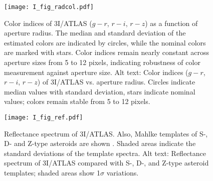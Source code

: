 \documentclass[]{pasj02}
\newcommand\I{3I/ATLAS\xspace}
\begin{document}
\begin{figure*}
 \begin{center}
  \texttt{[image: I\_fig\_radcol.pdf]} 
 \end{center}
\caption{
    Color indices of 3I/ATLAS ($g - r$, $r - i$, $r - z$) 
    as a function of aperture radius. 
    The median and standard deviation of the estimated colors are indicated by circles, while the nominal colors are marked with stars.
    Color indices remain nearly constant across aperture sizes from 5 to 12 pixels, indicating robustness of color measurement against aperture size.
    {Alt text: 
    Color indices ($g - r$, $r - i$, $r - z$) of 3I/ATLAS vs. aperture radius. Circles indicate median values with standard deviation, stars indicate nominal values; colors remain stable from 5 to 12 pixels.} 
}\label{fig:radcol}
\end{figure*}


\begin{figure}
 \begin{center}
  \texttt{[image: I\_fig\_ref.pdf]} 
 \end{center}
\caption{
Reflectance spectrum of \I.
Also, Mahlke templates of S-, D- and Z-type asteroids are shown \citep{Mahlke2022}.
Shaded areas indicate the standard deviations of the template spectra. 
    {Alt text: Reflectance spectrum of 3I/ATLAS compared with S-, D-, and Z-type asteroid templates; shaded areas show 1$\sigma$ variations.} 
}\label{fig:ref}
\end{figure}
\end{document}
